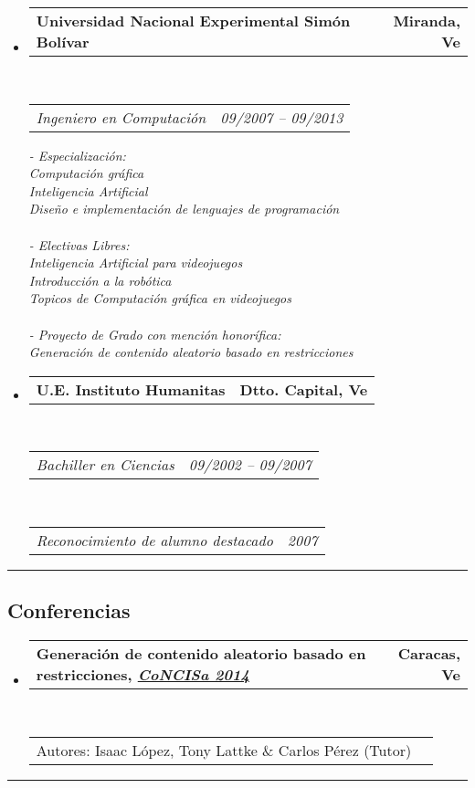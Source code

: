 \documentclass[10pt,letterpaper]{article}
\makeatletter
\newcommand{\headerrow}[2]
{\begin{tabular*}{\linewidth}{l@{\extracolsep{\fill}}r}
	#1 &
	#2 \\
\end{tabular*}}
\makeatother
\begin{document}
\begin{itemize}
	\parskip=0.1em

\item 
   \headerrow
   {\textbf{Universidad Nacional Experimental Simón Bolívar}}
   {\textbf{Miranda, Ve}}
	\\
	\headerrow
   {\emph{Ingeniero en Computación}}
   {\emph{09/2007 -- 09/2013}}
   
   
   {\emph{- Especialización:}}
   \\
   {\emph{     Computación gráfica}}
   \\
   {\emph{     Inteligencia Artificial}}
   \\
   {\emph{     Diseño e implementación de lenguajes de programación}}
   \\
   \\
   {\emph{- Electivas Libres:}}
   \\
   {\emph{     Inteligencia Artificial para videojuegos}}
   \\
   {\emph{     Introducción a la robótica}}
   \\
   {\emph{     Topicos de Computación gráfica en videojuegos}}
   \\
   \\
   {\emph{- Proyecto de Grado con mención honorífica:}}
   \\
   {\emph{     Generación de contenido aleatorio basado en restricciones}}

 \item 
   \headerrow
   {\textbf{U.E. Instituto Humanitas}}
   {\textbf{Dtto. Capital, Ve}}
	\\
	\headerrow
   {\emph{Bachiller en Ciencias}}
   {\emph{09/2002 -- 09/2007}}
	\\
	\headerrow
   {\emph{Reconocimiento de alumno destacado}}
   {\emph{2007}}
\end{itemize}

\hrule
\vspace{-0.4em}
\subsection*{Conferencias}

\begin{itemize}
  \parskip=0.1em
\item 
   \headerrow
   {\textbf{Generación de contenido aleatorio basado en restricciones, \emph{\href{http://www.concisa.net.ve/2014/}{CoNCISa 2014}}}}
   {\textbf{Caracas, Ve}}
  \\
  \headerrow
   {Autores: Isaac López, Tony Lattke \& Carlos Pérez (Tutor)}{}
\end{itemize}
\hrule
\vspace{-0.4em}
\end{document}
